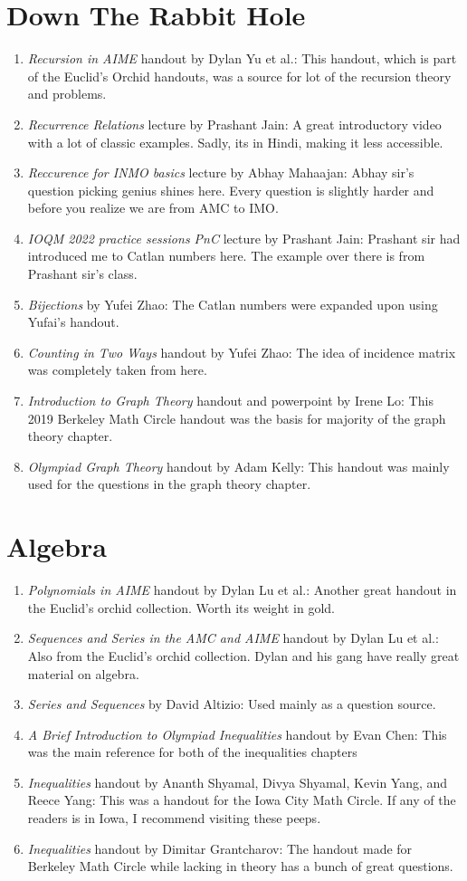 \section{Down The Rabbit Hole}
\begin{enumerate}
    \item \emph{Recursion in AIME} handout by Dylan Yu et al.: This handout, which is part of the Euclid's Orchid handouts, was a source for lot of the recursion theory and problems.
    \item \emph{Recurrence Relations} lecture by Prashant Jain: A great introductory video with a lot of classic examples. Sadly, its in Hindi, making it less accessible.
    \item \emph{Reccurence for INMO basics} lecture by Abhay Mahaajan: Abhay sir's question picking genius shines here. Every question is slightly harder and before you realize we are from AMC to IMO.
    \item \emph{IOQM 2022 practice sessions PnC} lecture by Prashant Jain: Prashant sir had introduced me to Catlan numbers here. The example over there is from Prashant sir's class.
    \item \emph{Bijections} by Yufei Zhao: The Catlan numbers were expanded upon using Yufai's handout.
    \item \emph{Counting in Two Ways} handout by Yufei Zhao: The idea of incidence matrix was completely taken from here.
    \item \emph{Introduction to Graph Theory} handout and powerpoint by Irene Lo: This 2019 Berkeley Math Circle handout was the basis for majority of the graph theory chapter.
    \item \emph{Olympiad Graph Theory} handout by Adam Kelly: This handout was mainly used for the questions in the graph theory chapter.
\end{enumerate}
\section{Algebra}
\begin{enumerate}
    \item \emph{Polynomials in AIME} handout by Dylan Lu et al.: Another great handout in the Euclid's orchid collection. Worth its weight in gold.
    \item \emph{Sequences and Series in the AMC and AIME} handout by Dylan Lu et al.: Also from the Euclid's orchid collection. Dylan and his gang have really great material on algebra.
    \item \emph{Series and Sequences} by David Altizio: Used mainly as a question source.
    \item \emph{A Brief Introduction to Olympiad Inequalities} handout by Evan Chen: This was the main reference for both of the inequalities chapters
    \item \emph{Inequalities} handout by Ananth Shyamal, Divya Shyamal, Kevin Yang, and Reece Yang: This was a handout for the Iowa City Math Circle. If any of the readers is in Iowa, I recommend visiting these peeps.
    \item \emph{Inequalities} handout by Dimitar Grantcharov: The handout made for Berkeley Math Circle while lacking in theory has a bunch of great questions.
\end{enumerate}
